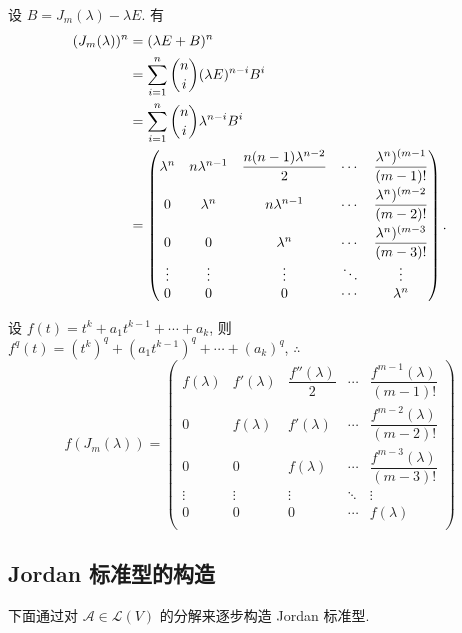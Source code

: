 \documentclass[color=black,device=normal,lang=cn,mode=geye]{elegantnote}
\begin{document}
\begin{example}[书上的例 3]
    设 $B=J_m(\lambda)-\lambda E$. 有
    \begin{equation}\label{eq4.1}
        \begin{aligned}
            (J_m(\lambda))^n & =(\lambda E+B)^n \\
            & =\sum\limits_{i=1}^n\dbinom{n}{i}(\lambda E)^{n-i}B^i \\
            & =\sum\limits_{i=1}^n\dbinom{n}{i}\lambda^{n-i}B^i \\
            & =\begin{pmatrix}
                \lambda^n & n\lambda^{n-1} & \dfrac{n(n-1)\lambda^{n-2}}{2} & \cdots & \dfrac{\lambda^n)^{(m-1}}{(m-1)!} \\[8pt]
                0 & \lambda^n & n\lambda^{n-1} & \cdots & \dfrac{\lambda^n)^{(m-2}}{(m-2)!} \\[8pt]
                0 & 0 & \lambda^n & \cdots & \dfrac{\lambda^n)^{(m-3}}{(m-3)!} \\
                \vdots & \vdots & \vdots & \ddots & \vdots \\
                0 & 0 & 0 & \cdots & \lambda^n \\
            \end{pmatrix}.
        \end{aligned}
    \end{equation}

    设 $f(t)=t^k+a_1t^{k-1}+\cdots+a_k$, 则 $f^{q}(t)=(t^k)^{q}+(a_1t^{k-1})^{q}+\cdots+(a_k)^{q}$, $\therefore$
    \[f(J_m(\lambda))=\begin{pmatrix}
        f(\lambda) & f'(\lambda) & \dfrac{f''(\lambda)}{2} & \cdots & \dfrac{f^{m-1}(\lambda)}{(m-1)!} \\[8pt]
        0 & f(\lambda) & f'(\lambda) & \cdots & \dfrac{f^{m-2}(\lambda)}{(m-2)!} \\[8pt]
        0 & 0 & f(\lambda) & \cdots & \dfrac{f^{m-3}(\lambda)}{(m-3)!} \\
        \vdots & \vdots & \vdots & \ddots & \vdots \\
        0 & 0 & 0 & \cdots & f(\lambda) \\
    \end{pmatrix}\]
\end{example}
\subsection{Jordan 标准型的构造}
下面通过对 $\mathcal{A}\in\mathcal{L}(V)$ 的分解来逐步构造 Jordan 标准型.
\end{document}

